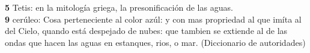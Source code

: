 \noindent \textbf{5} Tetis: en la mitología griega, la presonificación de las aguas.\\
\noindent \textbf{9} cerúleo:  Cosa perteneciente al color azúl: y con mas propriedad al que imíta al del Cielo, quando está despejado de nubes: que tambien se extiende al de las ondas que hacen las aguas en estanques, rios, o mar. (Diccionario de autoridades)

